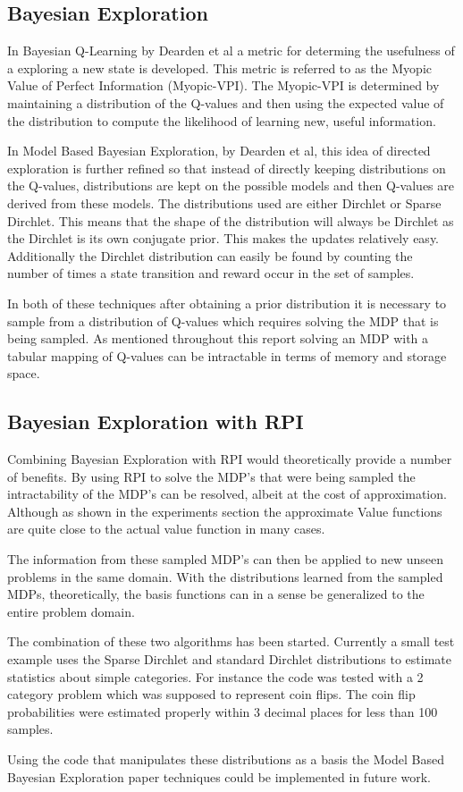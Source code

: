 \documentclass[12pt, letterpaper, final]{report}
\begin{document}
\subsection*{Bayesian Exploration}

In Bayesian Q-Learning by Dearden et al a metric for determing the
usefulness of a exploring a new state is developed. \cite{dearden_bayesian_1998}This metric is
referred to as the Myopic Value of Perfect Information
(Myopic-VPI). The Myopic-VPI is determined by maintaining a
distribution of the Q-values and then using the expected value of the
distribution to compute the likelihood of learning new, useful
information.

In Model Based Bayesian Exploration, by Dearden et al, this idea of
directed exploration is further refined so that instead of directly
keeping distributions on the Q-values, distributions are kept on the
possible models and then Q-values are derived from these
models. \cite{dearden_model_1999} The distributions used are either
Dirchlet or Sparse Dirchlet. This means that the shape of the
distribution will always be Dirchlet as the Dirchlet is its own
conjugate prior. This makes the updates relatively easy. Additionally
the Dirchlet distribution can easily be found by counting the number
of times a state transition and reward occur in the set of samples.

In both of these techniques after obtaining a prior distribution it is necessary to sample from a
distribution of Q-values which requires solving the MDP that is being
sampled. As mentioned throughout this report solving an MDP with
a tabular mapping of Q-values can be intractable in terms of memory
and storage space.

\subsection*{Bayesian Exploration with RPI}

Combining Bayesian Exploration with RPI would theoretically provide a
number of benefits. By using RPI to solve the MDP's that were being
sampled the intractability of the MDP's can be resolved, albeit at the
cost of approximation. Although as shown in the experiments section
the approximate Value functions are quite close to the actual value
function in many cases.

The information from these sampled MDP's can then be applied to new
unseen problems in the same domain. With the distributions learned
from the sampled MDPs, theoretically, the basis functions can  in a sense be
generalized to the entire problem domain.

The combination of these two algorithms has been started. Currently a
small test example uses the Sparse Dirchlet and standard Dirchlet
distributions to estimate statistics about simple categories. For
instance the code was tested with a 2 category problem which was
supposed to represent coin flips. The coin flip probabilities were
estimated properly within 3 decimal places for less than 100 samples.

Using the code that manipulates these distributions as a basis the
Model Based Bayesian Exploration paper techniques could be
implemented in future work.
\end{document}
